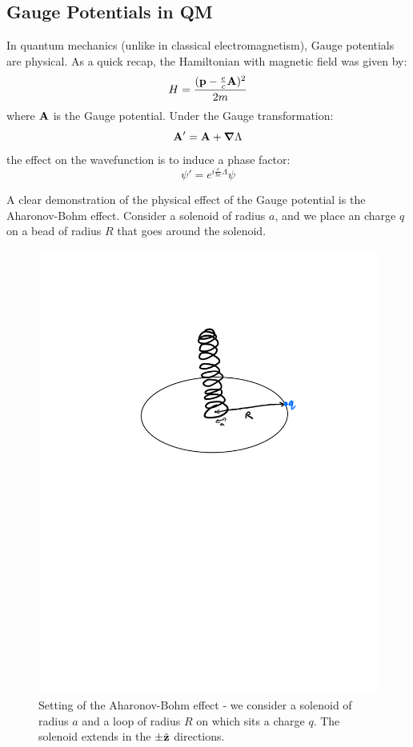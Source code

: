 \subsection{Gauge Potentials in QM}
In quantum mechanics (unlike in classical electromagnetism), Gauge potentials are physical. As a quick recap, the Hamiltonian with magnetic field was given by:
\begin{equation}
    H = \frac{(\mathbf{p} - \frac{e}{c}\mathbf{A})^2}{2m}
\end{equation} 
where $\mathbf{A}$ is the Gauge potential. Under the Gauge transformation:
\begin{equation}
    \v{A}' = \v{A} + \nabla \Lambda
\end{equation}
the effect on the wavefunction is to induce a phase factor:
\begin{equation}
    \psi' = e^{i\frac{e}{\hbar c}\Lambda}\psi
\end{equation}

A clear demonstration of the physical effect of the Gauge potential is the Aharonov-Bohm effect. Consider a solenoid of radius $a$, and we place an charge $q$ on a bead of radius $R$ that goes around the solenoid.

\begin{figure}[htbp]
    \centering
    \includegraphics[scale=0.6]{Images/fig-solenoid.pdf}
    \caption{Setting of the Aharonov-Bohm effect - we consider a solenoid of radius $a$ and a loop of radius $R$ on which sits a charge $q$. The solenoid extends in the $\pm \hat{\mathbf{z}}$ directions.}
    \label{fig-solenoid}
\end{figure}

